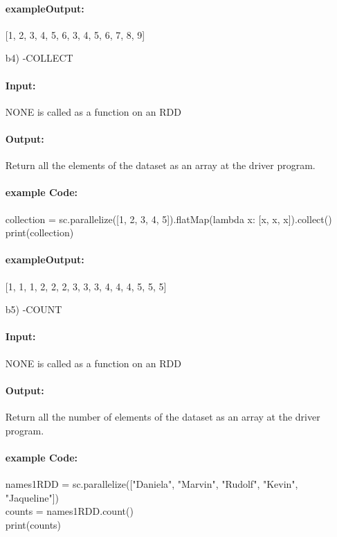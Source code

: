 \documentclass[11pt,a4paper]{scrartcl}
\begin{document}
\begin{itemize}
		\paragraph*{exampleOutput:}
		[1, 2, 3, 4, 5, 6, 3, 4, 5, 6, 7, 8, 9]
		
	\item[b4)]
		-COLLECT
		\paragraph*{Input:}
		NONE is called as a function on an RDD
		
		\paragraph*{Output:}
		Return all the elements of the dataset as an array at the driver program.
		
		\paragraph*{example Code:}
		collection = sc.parallelize([1, 2, 3, 4, 5]).flatMap(lambda x: [x, x, x]).collect()\\
    		print(collection)\\
		
		\paragraph*{exampleOutput:}
		[1, 1, 1, 2, 2, 2, 3, 3, 3, 4, 4, 4, 5, 5, 5]
		
	\item[b5)]
		-COUNT
		\paragraph*{Input:}
		NONE is called as a function on an RDD
		
		\paragraph*{Output:}
		Return all the number of elements of the dataset as an array at the driver program.
		
		\paragraph*{example Code:}
		names1RDD = sc.parallelize(["Daniela", "Marvin", "Rudolf", "Kevin", "Jaqueline"])\\
    		counts = names1RDD.count()\\
    		print(counts)\\
		

\end{itemize}
\end{document}
